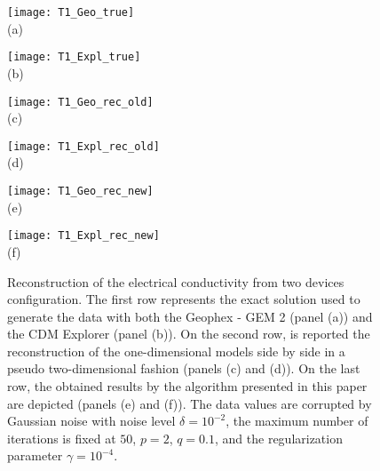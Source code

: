 \documentclass[final,leqno]{siamltex}
\begin{document}
\begin{figure}
\centering
\begin{minipage}{0.4\linewidth}
	\centering
	\texttt{[image: T1\_Geo\_true]}\\(a)
\end{minipage}
\begin{minipage}{0.4\linewidth}
	\centering
	\texttt{[image: T1\_Expl\_true]}\\(b)
\end{minipage}

\begin{minipage}{0.4\linewidth}
	\centering
	\texttt{[image: T1\_Geo\_rec\_old]}\\(c)
\end{minipage}
\begin{minipage}{0.4\linewidth}
	\centering
	\texttt{[image: T1\_Expl\_rec\_old]}\\(d)
\end{minipage}

\begin{minipage}{0.4\linewidth}
	\centering
	\texttt{[image: T1\_Geo\_rec\_new]}\\(e)
\end{minipage}
\begin{minipage}{0.4\linewidth}
	\centering
	\texttt{[image: T1\_Expl\_rec\_new]}\\(f)
\end{minipage}
\caption{Reconstruction of the electrical conductivity from two devices configuration. The first row represents the exact solution used to generate the data with both the Geophex - GEM 2 (panel (a)) and the CDM Explorer (panel (b)). On the second row, is reported the reconstruction of the one-dimensional models side by side in a pseudo two-dimensional fashion (panels (c) and (d)). On the last row, the obtained results by the algorithm presented in this paper are depicted (panels (e) and (f)). The data values are corrupted by Gaussian noise with noise level $\delta = 10^{-2}$, the maximum number of iterations is fixed at $50$, $p=2$, $q=0.1$, and the regularization parameter $\gamma = 10^{-4}$.}
\label{Figure2}
\end{figure}
\end{document}
